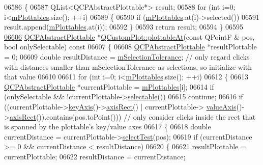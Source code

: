 \begin{DoxyCode}
06586 \textcolor{keyword}{}\{
06587   QList<QCPAbstractPlottable*> result;
06588   \textcolor{keywordflow}{for} (\textcolor{keywordtype}{int} i=0; i<\hyperlink{a00116_a57ed6eb2e0a767a8344de45110a3e81d}{mPlottables}.size(); ++i)
06589   \{
06590     \textcolor{keywordflow}{if} (\hyperlink{a00116_a57ed6eb2e0a767a8344de45110a3e81d}{mPlottables}.at(i)->selected())
06591       result.append(\hyperlink{a00116_a57ed6eb2e0a767a8344de45110a3e81d}{mPlottables}.at(i));
06592   \}
06593   \textcolor{keywordflow}{return} result;
06594 \}
06595 
\hypertarget{a00115_source_l06606}{}\hyperlink{a00116_ac1d1bc6ae4e13616fb02cef6d9e2188e}{06606} \hyperlink{a00024}{QCPAbstractPlottable} *\hyperlink{a00116_ac1d1bc6ae4e13616fb02cef6d9e2188e}{QCustomPlot::plottableAt}(\textcolor{keyword}{const} QPointF &
      pos, \textcolor{keywordtype}{bool} onlySelectable)\textcolor{keyword}{ const}
06607 \textcolor{keyword}{}\{
06608   \hyperlink{a00024}{QCPAbstractPlottable} *resultPlottable = 0;
06609   \textcolor{keywordtype}{double} resultDistance = \hyperlink{a00116_a6694031fcdb13682d098f5d21da86f97}{mSelectionTolerance}; \textcolor{comment}{// only regard clicks with distances
       smaller than mSelectionTolerance as selections, so initialize with that value}
06610   
06611   \textcolor{keywordflow}{for} (\textcolor{keywordtype}{int} i=0; i<\hyperlink{a00116_a57ed6eb2e0a767a8344de45110a3e81d}{mPlottables}.size(); ++i)
06612   \{
06613     \hyperlink{a00024}{QCPAbstractPlottable} *currentPlottable = \hyperlink{a00116_a57ed6eb2e0a767a8344de45110a3e81d}{mPlottables}[i];
06614     \textcolor{keywordflow}{if} (onlySelectable && !currentPlottable->\hyperlink{a00024_af895574da1ec0d050711b6c9deda296a}{selectable}())
06615       \textcolor{keywordflow}{continue};
06616     \textcolor{keywordflow}{if} ((currentPlottable->\hyperlink{a00024_a72c7a09c22963f2c943f07112b311103}{keyAxis}()->\hyperlink{a00025_a7fe5b84f4891838b63ed5181f5811dc5}{axisRect}() | currentPlottable->
      \hyperlink{a00024_a3106f9d34d330a6097a8ec5905e5b519}{valueAxis}()->\hyperlink{a00025_a7fe5b84f4891838b63ed5181f5811dc5}{axisRect}()).contains(pos.toPoint())) \textcolor{comment}{// only consider clicks inside the rect
       that is spanned by the plottable's key/value axes}
06617     \{
06618       \textcolor{keywordtype}{double} currentDistance = currentPlottable->\hyperlink{a00024_a0fd218d6c4974b6ab05bd2f688818556}{selectTest}(pos);
06619       \textcolor{keywordflow}{if} (currentDistance >= 0 && currentDistance < resultDistance)
06620       \{
06621         resultPlottable = currentPlottable;
06622         resultDistance = currentDistance;

\end{DoxyCode}
